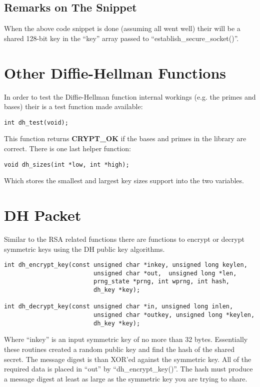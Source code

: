 \documentclass[b5paper]{book}
\begin{document}
\subsection{Remarks on The Snippet}
When the above code snippet is done (assuming all went well) their will be a shared 128-bit key in the ``key'' array
passed to ``establish\_secure\_socket()''.

\section{Other Diffie-Hellman Functions}
In order to test the Diffie-Hellman function internal workings (e.g. the primes and bases) their is a test function made
available:
\begin{verbatim}
int dh_test(void);
\end{verbatim}

This function returns {\bf CRYPT\_OK} if the bases and primes in the library are correct.  There is one last helper 
function:
\begin{verbatim}
void dh_sizes(int *low, int *high);
\end{verbatim}
Which stores the smallest and largest key sizes support into the two variables.

\section{DH Packet}
Similar to the RSA related functions there are functions to encrypt or decrypt symmetric keys using the DH public key
algorithms.  
\begin{verbatim}
int dh_encrypt_key(const unsigned char *inkey, unsigned long keylen,
                         unsigned char *out,  unsigned long *len, 
                         prng_state *prng, int wprng, int hash, 
                         dh_key *key);

int dh_decrypt_key(const unsigned char *in, unsigned long inlen,
                         unsigned char *outkey, unsigned long *keylen, 
                         dh_key *key);
\end{verbatim}
Where ``inkey'' is an input symmetric key of no more than 32 bytes.  Essentially these routines created a random public key
and find the hash of the shared secret.  The message digest is than XOR'ed against the symmetric key.  All of the 
required data is placed in ``out'' by ``dh\_encrypt\_key()''.   The hash must produce a message digest at least as large
as the symmetric key you are trying to share.
\end{document}
